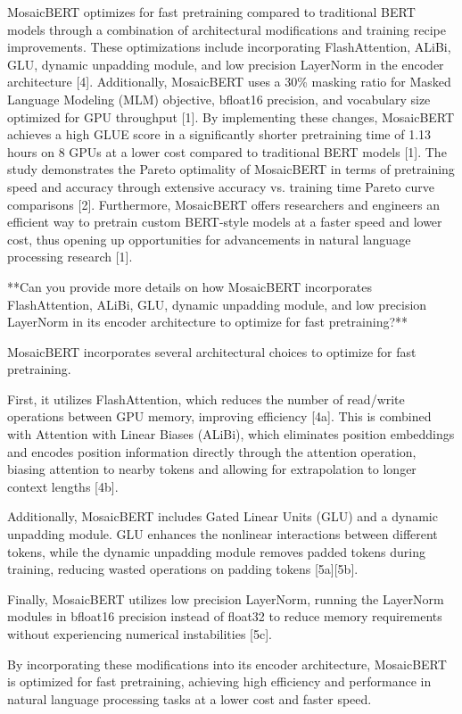 \documentclass{article}
\begin{document}
MosaicBERT optimizes for fast pretraining compared to traditional BERT models through a combination of architectural modifications and training recipe improvements. These optimizations include incorporating FlashAttention, ALiBi, GLU, dynamic unpadding module, and low precision LayerNorm in the encoder architecture [4]. Additionally, MosaicBERT uses a 30\% masking ratio for Masked Language Modeling (MLM) objective, bfloat16 precision, and vocabulary size optimized for GPU throughput [1]. By implementing these changes, MosaicBERT achieves a high GLUE score in a significantly shorter pretraining time of 1.13 hours on 8 GPUs at a lower cost compared to traditional BERT models [1]. The study demonstrates the Pareto optimality of MosaicBERT in terms of pretraining speed and accuracy through extensive accuracy vs. training time Pareto curve comparisons [2]. Furthermore, MosaicBERT offers researchers and engineers an efficient way to pretrain custom BERT-style models at a faster speed and lower cost, thus opening up opportunities for advancements in natural language processing research [1].

**Can you provide more details on how MosaicBERT incorporates FlashAttention, ALiBi, GLU, dynamic unpadding module, and low precision LayerNorm in its encoder architecture to optimize for fast pretraining?**

MosaicBERT incorporates several architectural choices to optimize for fast pretraining.

First, it utilizes FlashAttention, which reduces the number of read/write operations between GPU memory, improving efficiency [4a]. This is combined with Attention with Linear Biases (ALiBi), which eliminates position embeddings and encodes position information directly through the attention operation, biasing attention to nearby tokens and allowing for extrapolation to longer context lengths [4b].

Additionally, MosaicBERT includes Gated Linear Units (GLU) and a dynamic unpadding module. GLU enhances the nonlinear interactions between different tokens, while the dynamic unpadding module removes padded tokens during training, reducing wasted operations on padding tokens [5a][5b].

Finally, MosaicBERT utilizes low precision LayerNorm, running the LayerNorm modules in bfloat16 precision instead of float32 to reduce memory requirements without experiencing numerical instabilities [5c].

By incorporating these modifications into its encoder architecture, MosaicBERT is optimized for fast pretraining, achieving high efficiency and performance in natural language processing tasks at a lower cost and faster speed.
\end{document}
